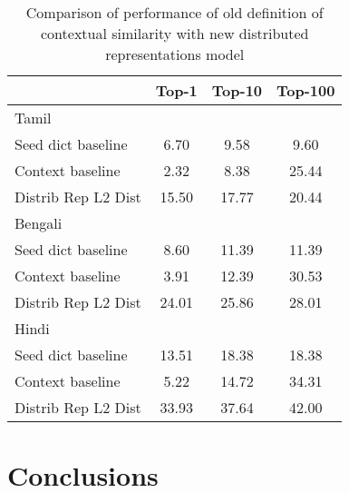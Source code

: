 \documentclass[11pt,letterpaper]{article}
\begin{document}
\begin{table}
\begin{center}
\begin{tabular}{|l|c|c|c|}
\hline
& Top-1 & Top-10 & Top-100 \\
\hline
\multicolumn{4}{|l|}{Tamil}  \\
\hline
Seed dict baseline & 6.70 & 9.58 & 9.60 \\
Context baseline & 2.32 & 8.38 & 25.44 \\ 
Distrib Rep L2 Dist & 15.50 & 17.77 & 20.44 \\
\hline
\multicolumn{4}{|l|}{Bengali}  \\
\hline
Seed dict baseline & 8.60 & 11.39 & 11.39 \\
Context baseline & 3.91 & 12.39 & 30.53 \\
Distrib Rep L2 Dist & 24.01 & 25.86 & 28.01 \\
\hline
\multicolumn{4}{|l|}{Hindi}  \\
\hline
Seed dict baseline & 13.51 & 18.38 & 18.38 \\
Context baseline & 5.22 & 14.72 & 34.31 \\
Distrib Rep L2 Dist & 33.93 & 37.64 & 42.00 \\
\hline
\end{tabular}
\end{center}
\caption{Comparison of performance of old definition of contextual similarity with new distributed representations model}\label{accresults}
\end{table}



\section{Conclusions} \label{sect:conclusions}



\end{document}
